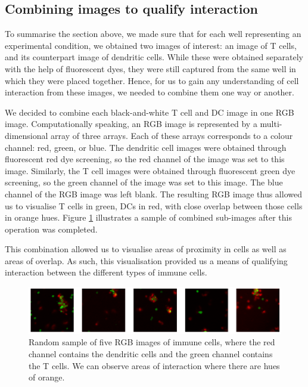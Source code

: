 \subsection{Combining images to qualify interaction} \label{subsec:combining}

To summarise the section above, we made sure that for each well representing an experimental condition, we obtained two images of interest: an image of T cells, and its counterpart image of dendritic cells. While these were obtained separately with the help of fluorescent dyes, they were still captured from the same well in which they were placed together. Hence, for us to gain any understanding of cell interaction from these images, we needed to combine them one way or another. 

We decided to combine each black-and-white T cell and DC image in one RGB image. Computationally speaking, an RGB image is represented by a multi-dimensional array of three arrays. Each of these arrays corresponds to a colour channel: red, green, or blue. The dendritic cell images were obtained through fluorescent red dye screening, so the red channel of the image was set to this image. Similarly, the T cell images were obtained through fluorescent green dye screening, so the green channel of the image was set to this image. The blue channel of the RGB image was left blank. The resulting RGB image thus allowed us to visualise T cells in green, DCs in red, with close overlap between those cells in orange hues. Figure \ref{fig:combined} illustrates a sample of combined sub-images after this operation was completed.

This combination allowed us to visualise areas of proximity in cells as well as areas of overlap. As such, this visualisation provided us a means of qualifying interaction between the different types of immune cells. 

\begin{figure}[h]
    \centering
    \includegraphics[width=\textwidth]{dissertation/figures/combined_cells.png}
    \caption{Random sample of five RGB images of immune cells, where the red channel contains the dendritic cells and the green channel contains the T cells. We can observe areas of interaction where there are hues of orange.}
    \label{fig:combined}
\end{figure}

